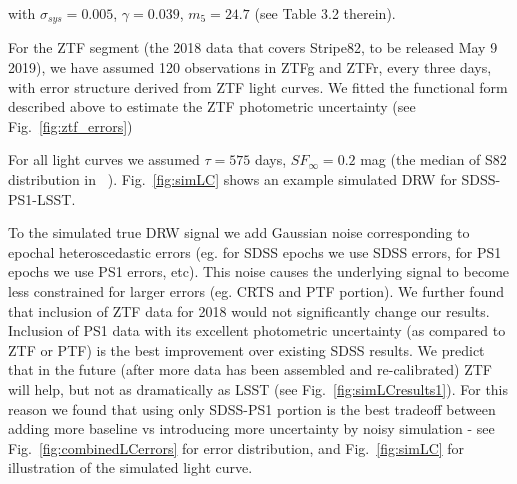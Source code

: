 \documentclass[twocolumn]{aastex62}
\begin{document}
with  $\sigma_{sys} = 0.005$, $\gamma=0.039$, $m_{5} = 24.7$ (see Table 3.2  therein).


For the ZTF segment (the 2018 data that covers Stripe82, to be released May 9 2019), we have assumed 120 observations in ZTFg and ZTFr, every three days, with error structure derived from ZTF light curves. We fitted the functional form described above to estimate the ZTF photometric uncertainty (see Fig.~\ref{fig:ztf_errors})



\begin{figure*}%
\caption{The rms spread as a function of magnitude for ZTF objects with over 100 observations. We overplot the functional describing the adopted error model. Properties of ZTF photometric uncertainty are largely similar to the PTF uncertainties.}
\label{fig:ztf_errors}
\end{figure*} 


For all light curves we assumed  $\tau = 575 $ days, $SF_{\infty} = 0.2$ mag (the median of S82 distribution in ~\citet{macleod2010}). Fig.~\ref{fig:simLC} shows an example simulated DRW for SDSS-PS1-LSST.

\begin{figure*}%
\caption{Simulated DRW process sampled at real cadence of SDSS, PS1, and simulated cadence of LSST. To each observed  point we add Gaussian noise corresponding to the reported  heteroscedastic (different for all points) errors for SDSS-PS1, and simulated magnitude-dependent errors for LSST. }
\label{fig:simLC}
\end{figure*} 

To the simulated true DRW signal we add Gaussian noise corresponding to epochal heteroscedastic errors (eg. for SDSS epochs we use SDSS errors, for PS1 epochs we use PS1 errors, etc). This noise causes the underlying signal to become less constrained for larger errors (eg. CRTS  and PTF portion).  We further found that inclusion of ZTF data for 2018 would not significantly change our results. Inclusion of PS1 data with its excellent photometric uncertainty (as compared to ZTF or PTF) is the best improvement over existing SDSS results.  We predict that in the future (after more data has been assembled and re-calibrated) ZTF will help, but not as dramatically as LSST (see Fig.~\ref{fig:simLCresults1}).  For this reason we found that using only SDSS-PS1 portion is the best tradeoff between adding more baseline vs introducing more uncertainty by noisy simulation  - see Fig.~\ref{fig:combinedLCerrors} for error distribution, and Fig.~\ref{fig:simLC} for illustration of  the simulated light curve. 
\end{document}
